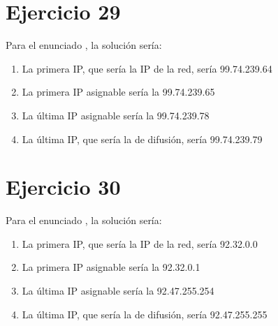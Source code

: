 \documentclass[letterpaper,10pt,spanish]{sphinxmanual}
\begin{document}
\section{Ejercicio 29}
\label{\detokenize{t2_integracion_elementos/ejercicios_subredes_ipv4/rangos_direcciones:id29}}
\sphinxAtStartPar
Para el enunciado , la solución sería:
\begin{enumerate}
%
\item {} 
\sphinxAtStartPar
La primera IP, que sería la IP de la red, sería 99.74.239.64

\item {} 
\sphinxAtStartPar
La primera IP asignable sería la 99.74.239.65

\item {} 
\sphinxAtStartPar
La última IP asignable sería la 99.74.239.78

\item {} 
\sphinxAtStartPar
La última IP, que sería la de difusión, sería 99.74.239.79

\end{enumerate}


\section{Ejercicio 30}
\label{\detokenize{t2_integracion_elementos/ejercicios_subredes_ipv4/rangos_direcciones:id30}}
\sphinxAtStartPar
Para el enunciado , la solución sería:
\begin{enumerate}
%
\item {} 
\sphinxAtStartPar
La primera IP, que sería la IP de la red, sería 92.32.0.0

\item {} 
\sphinxAtStartPar
La primera IP asignable sería la 92.32.0.1

\item {} 
\sphinxAtStartPar
La última IP asignable sería la 92.47.255.254

\item {} 
\sphinxAtStartPar
La última IP, que sería la de difusión, sería 92.47.255.255

\end{enumerate}
\end{document}
